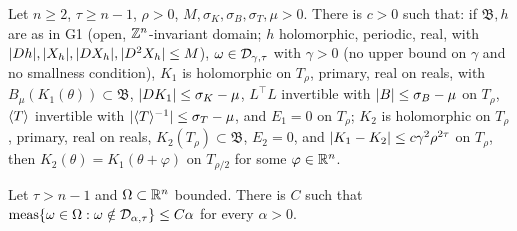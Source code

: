 \begin{theorem}\label{bp:p0:g2}
Let $n\ge2$, $\tau\ge n-1$, $\rho>0$, $M,\sigma_K,\sigma_B,\sigma_T,\mu>0$. There is $c>0$ such that:
if $\mathfrak{B},h$ are as in G1 (open, $\mathbb{Z}^n$-invariant domain; $h$ holomorphic, periodic, real, with
$\lvert Dh\rvert,\lvert X_h\rvert,\lvert DX_h\rvert,\lvert D^2X_h\rvert\le M$), $\omega\in\mathcal{D}_{\gamma,\tau}$ with $\gamma>0$ (no upper
bound on $\gamma$ and no smallness condition), $K_1$ is holomorphic on $T_\rho$, primary, real on reals, with
$B_\mu(K_1(\theta))\subset\mathfrak{B}$, $\lvert DK_1\rvert\le\sigma_K-\mu$, $L^\top L$ invertible with
$\lvert B\rvert\le\sigma_B-\mu$ on $T_\rho$, $\langle T\rangle$ invertible with $\lvert \langle T\rangle^{-1}\rvert\le\sigma_T-\mu$, and
$E_1=0$ on $T_\rho$; $K_2$ is holomorphic on $T_\rho$,
primary, real on reals, $K_2(T_\rho)\subset\mathfrak{B}$, $E_2=0$, and
$\lvert K_1-K_2\rvert\le c\gamma^2\rho^{2\tau}$ on $T_\rho$, then $K_2(\theta)=K_1(\theta+\varphi)$ on
$T_{\rho/2}$ for some $\varphi\in\mathbb{R}^n$.
\end{theorem}

\begin{theorem}\label{bp:p0:g3}
Let $\tau>n-1$ and $\Omega\subset\mathbb{R}^n$ bounded. There is $C$ such that
$\operatorname{meas}\{\omega\in\Omega:\omega\notin\mathcal{D}_{\alpha,\tau}\}\le C\alpha$ for every $\alpha>0$.
\end{theorem}

